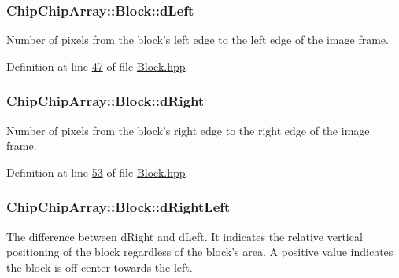 \hypertarget{classChipChipArray_1_1Block_aca89dc06d62feb9a6478a06976171b2b}{
\subsubsection[{d\+Left}]{ Chip\+Chip\+Array\+::\+Block\+::d\+Left}}\label{classChipChipArray_1_1Block_aca89dc06d62feb9a6478a06976171b2b}
Number of pixels from the block's left edge to the left edge of the image frame. 

Definition at line \hyperlink{Block_8hpp_source_l00047}{47} of file \hyperlink{Block_8hpp_source}{Block.\+hpp}.

\hypertarget{classChipChipArray_1_1Block_a6a4b0aa6aae7e41d836c8955e209c16e}{
\subsubsection[{d\+Right}]{ Chip\+Chip\+Array\+::\+Block\+::d\+Right}}\label{classChipChipArray_1_1Block_a6a4b0aa6aae7e41d836c8955e209c16e}
Number of pixels from the block's right edge to the right edge of the image frame. 

Definition at line \hyperlink{Block_8hpp_source_l00053}{53} of file \hyperlink{Block_8hpp_source}{Block.\+hpp}.

\hypertarget{classChipChipArray_1_1Block_a2d02c7b99ca656960fc9724587791999}{
\subsubsection[{d\+Right\+Left}]{ Chip\+Chip\+Array\+::\+Block\+::d\+Right\+Left}}\label{classChipChipArray_1_1Block_a2d02c7b99ca656960fc9724587791999}
The difference between d\+Right and d\+Left. It indicates the relative vertical positioning of the block regardless of the block's area. A positive value indicates the block is off-\/center towards the left. 

